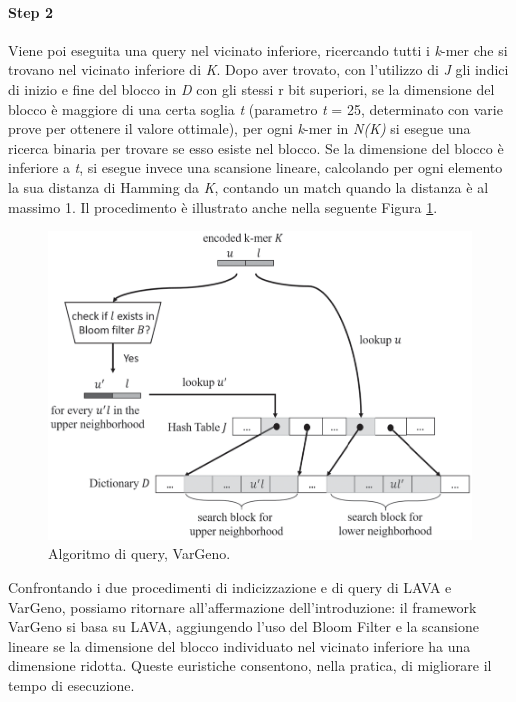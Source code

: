 \documentclass[../main.tex]{subfiles}
\begin{document}
\paragraph{Step 2} Viene poi eseguita una query nel vicinato inferiore, ricercando tutti i \textit{k}-mer che si trovano nel vicinato inferiore di \textit{K}. Dopo aver trovato, con l'utilizzo di \textit{J} gli indici di inizio e fine del blocco in \textit{D} con gli stessi r bit superiori, se la dimensione del blocco è maggiore di una certa soglia \textit{t} (parametro \textit{t} = 25, determinato con varie prove per ottenere il valore ottimale), per ogni \textit{k}-mer in \textit{N(K)} si esegue una ricerca binaria per trovare se esso esiste nel blocco. Se la dimensione del blocco è inferiore a \textit{t}, si esegue invece una scansione lineare, calcolando per ogni elemento la sua distanza di Hamming da \textit{K}, contando un match quando la distanza è al massimo 1. Il procedimento è illustrato anche nella seguente Figura \ref{fig:vargeno}.

\begin{figure}[h!]
	\centering
  	\captionsetup{justification=centering}
 	\includegraphics[scale=.40]{images/vargeno-query.png}
  	\caption{Algoritmo di query, VarGeno.}
  	\label{fig:vargeno}
\end{figure}

\noindent
Confrontando i due procedimenti di indicizzazione e di query di LAVA e VarGeno, possiamo ritornare all'affermazione dell'introduzione: il framework VarGeno si basa su LAVA, aggiungendo l'uso del Bloom Filter e la scansione lineare se la dimensione del blocco individuato nel vicinato inferiore ha una dimensione ridotta. Queste euristiche consentono, nella pratica, di migliorare il tempo di esecuzione.
\end{document}
